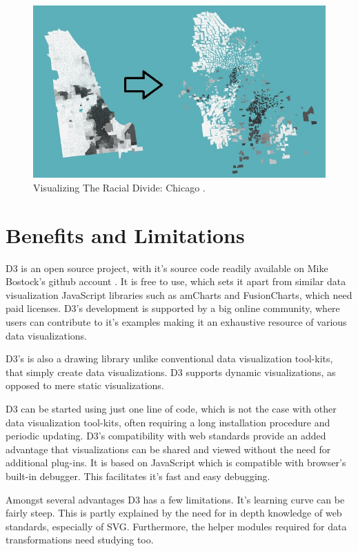 \documentclass[9pt,twocolumn,twoside]{../../styles/osajnl}
\begin{document}
\begin{figure}[h]
\centering
\includegraphics[scale=0.4]{images/4}
\centering
\caption{Visualizing The Racial Divide: Chicago \cite{www-chicago}.}
\end{figure}




\section{Benefits and Limitations}
D3 is an open source project, with it's source code readily available on Mike Bostock's github account \cite{www-mike}. It is free to use, which sets it apart from similar data visualization JavaScript libraries such as amCharts and FusionCharts, which need paid licenses. D3's development is supported by a big online community, where users can contribute to it's examples making it an exhaustive resource of various data visualizations. 

D3's is also a drawing library unlike conventional data visualization tool-kits, that simply create data visualizations. D3 supports dynamic visualizations, as opposed to mere static visualizations. 

D3 can be started using just one line of code, which is not the case with other data visualization tool-kits, often requiring a long installation procedure and periodic updating. D3's compatibility with web standards provide an added advantage that visualizations can be shared and viewed without the need for additional plug-ins. It is based on JavaScript which is compatible with browser’s built-in debugger. This facilitates it's fast and easy debugging.

Amongst several advantages D3 has a few limitations. It's  learning curve can be fairly steep. This is partly explained by the need for in depth knowledge of web standards, especially of SVG. Furthermore, the helper modules required for data transformations need studying too. 
\end{document}
